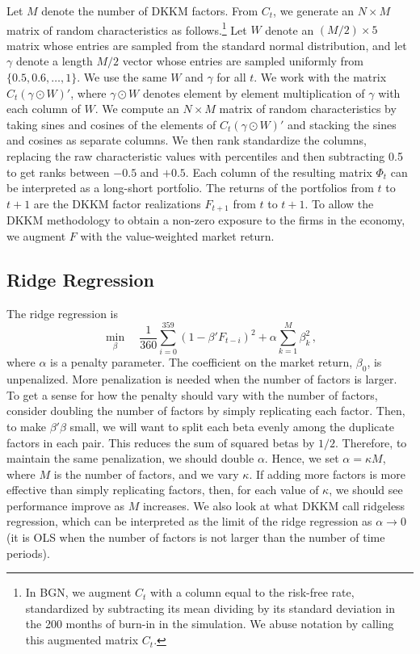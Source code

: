 \documentclass[12pt]{scrarticle}
\begin{document}
Let $M$ denote the number of DKKM factors. From $C_t$, we generate an $N \times M$ matrix of random characteristics as follows.\footnote{In BGN, we augment $C_t$ with a column equal to the risk-free rate, standardized by subtracting its mean dividing by its standard deviation in the 200 months of burn-in in the simulation. We abuse notation by calling this augmented matrix $C_t.$} Let $W$ denote an $(M/2) \times 5$ matrix whose entries are sampled from the standard normal distribution, and let $\gamma$ denote a length $M/2$ vector whose entries are sampled uniformly from $\{0.5, 0.6, \ldots, 1\}$.  We use the same $W$ and $\gamma$ for all $t$.  We work with the matrix $C_t(\gamma \odot W)'$, where $\gamma \odot W$ denotes element by element multiplication of  $\gamma$ with each column of $W$.  We compute an $N \times M$ matrix of random characteristics by taking sines and cosines of the elements of $C_t(\gamma \odot W)'$ and stacking the sines and cosines as separate columns.  
We then rank standardize the columns, replacing the raw characteristic values with percentiles and then subtracting 0.5 to get ranks between $-0.5$ and $+0.5$.  Each column of the resulting matrix $\Phi_t$ can be interpreted as a long-short portfolio. The returns of the portfolios from
$t$ to $t + 1$ are the DKKM factor realizations $F_{t+1}$ from $t$ to $t + 1.$ To allow the DKKM methodology to obtain a non-zero exposure to the firms in the economy, we augment $F$ with the value-weighted market return. 


\subsection{Ridge Regression}\label{ss:ridge}

The ridge regression is 
\begin{equation}\label{ridge}
  \min_\beta \quad \frac{1}{360} \sum_{i=0}^{359} \left(1 - \beta' F_{t-i}\right)^2 + \alpha \sum_{k = 1}^M \beta_k^2\,,
\end{equation}
where $\alpha$ is a penalty parameter.  The coefficient on the market return, $\beta_0$, is unpenalized. More penalization is needed when the number of factors is larger.  To get a sense for how the penalty should vary with the number of factors, consider doubling the number of factors by simply replicating each factor.  Then, to make $\beta'\beta$ small, we will want to split each beta evenly among the duplicate factors in each pair.  This reduces the sum of squared betas by $1/2$.  Therefore, to maintain the same penalization, we should double $\alpha$.  Hence, we set $\alpha = \kappa M$, where $M$ is the number of factors, and we vary $\kappa$.  If adding more factors is more effective than simply replicating factors, then, for each value of $\kappa$, we should see performance improve as $M$ increases.  We also look at what DKKM call ridgeless regression, which can be interpreted as the limit of the ridge regression as $\alpha \rightarrow 0$ (it is OLS when the number of factors is not larger than the number of time periods).  
\end{document}
